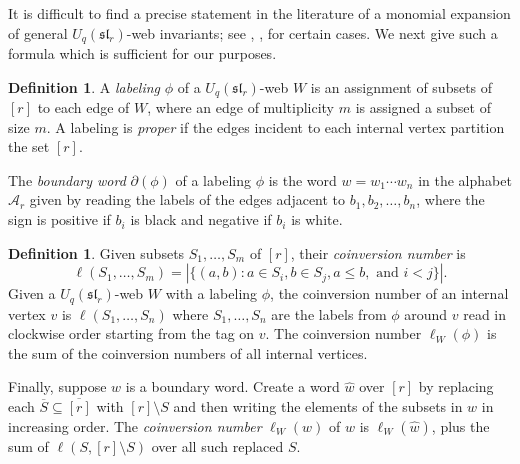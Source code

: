 \documentclass{amsart}
\theoremstyle{definition}
\newtheorem{definition}[theorem]{Definition}
\theoremstyle{remark}
\numberwithin{equation}{section}
\newcommand{\fsl}{\mathfrak{sl}}
\begin{document}
It is difficult to find a precise statement in the literature of a monomial expansion of general $U_q(\fsl_r)$-web invariants; see \cite{MOY}, \cite[(4.1)]{Fomin-Pylyavskyy-advances}, \cite[(5.5)]{Fraser-Lam-Le} for certain cases. We next give such a formula which is sufficient for our purposes.

\begin{definition}
\label{def:proper-labeling}
A \emph{labeling} $\phi$ of a $U_q(\fsl_r)$-web $W$ is an assignment of subsets of $[r]$ to each edge of $W$, where an edge of multiplicity $m$ is assigned a subset of size $m$. A labeling is \emph{proper} if the edges incident to each internal vertex partition the set $[r]$.

The \emph{boundary word} $\partial(\phi)$ of a labeling $\phi$ is the word $w = w_1 \cdots w_n$ in the alphabet $\mathcal{A}_r$ given by reading the labels of the edges adjacent to $b_1,b_2,\ldots,b_n$, where the sign is positive if $b_i$ is black and negative if $b_i$ is white.
\end{definition}

\begin{definition}
Given subsets $S_1, \ldots, S_m$ of $[r]$, their \emph{coinversion number} is
    \[ \ell(S_1, \ldots, S_m) = |\{(a, b) : a \in S_i, b \in S_j, a \leq b, \text{ and }i < j\}|. \]
Given a $U_q(\fsl_r)$-web $W$ with a labeling $\phi$, the coinversion number of an internal vertex $v$ is $\ell(S_1, \ldots, S_n)$ where $S_1, \ldots, S_n$ are the labels from $\phi$ around $v$ read in clockwise order starting from the tag on $v$. The coinversion number $\ell_W(\phi)$ is the sum of the coinversion numbers of all internal vertices.

Finally, suppose $w$ is a boundary word. Create a word $\hat{w}$ over $[r]$ by replacing each $\overline{S} \subseteq \overline{[r]}$ with $[r] \setminus S$ and then writing the elements of the subsets in $w$ in increasing order. The \emph{coinversion number} $\ell_W(w)$ of $w$ is $\ell_W(\hat{w})$, plus the sum of $\ell(S, [r] \setminus S)$ over all such replaced $S$.
\end{definition}
\end{document}
